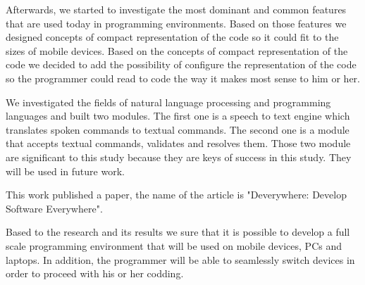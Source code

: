Afterwards, we started to investigate the most dominant and common features that are used today in programming environments. Based on those features we designed concepts of compact representation of the code so it could fit to the sizes of mobile devices. Based on the concepts of compact representation of the code we decided to add the possibility of configure the representation of the code so the programmer could read to code the way it makes most sense to him or her.

We investigated the fields of natural language processing and programming languages and built two modules. The first one is a speech to text engine which translates spoken commands to textual commands. The second one is a module that accepts textual commands, validates and resolves them. Those two module are significant to this study because they are keys of success in this study. They will be used in future work.

This work published a paper, the name of the article is "Deverywhere: Develop Software Everywhere".

Based to the research and its results we sure that it is possible to develop a full scale programming environment that will be used on mobile devices, PCs and laptops. In addition, the programmer will be able to seamlessly switch devices in order to proceed with his or her codding.